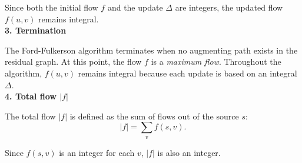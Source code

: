 \documentclass[12pt]{article}
\begin{document}
Since both the initial flow \( f \) and the update \( \Delta \) are integers, the updated flow \( f(u, v) \) remains integral.\\
\textbf{3. Termination}  

The Ford-Fulkerson algorithm terminates when no augmenting path exists in the residual graph. At this point, the flow \( f \) is a \textit{maximum flow}. Throughout the algorithm, \( f(u, v) \) remains integral because each update is based on an integral \( \Delta \).\\
\textbf{4. Total flow \( |f| \)}  

The total flow \( |f| \) is defined as the sum of flows out of the source \( s \):
\[
|f| = \sum_{v} f(s, v).
\]

Since \( f(s, v) \) is an integer for each \( v \), \( |f| \) is also an integer.
\end{document}
